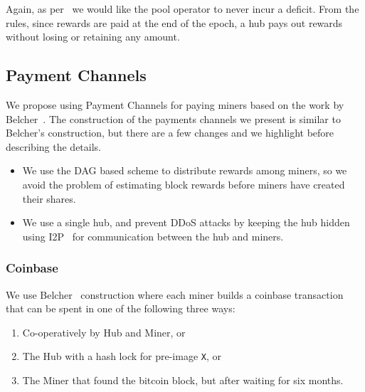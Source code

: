 \documentclass{article}
\begin{document}
Again, as per~\cite{incentives-compatible} we would like the pool
operator to never incur a deficit. From the rules, since rewards are
paid at the end of the epoch, a hub pays out rewards without losing or
retaining any amount.

\subsection{Payment Channels}\label{ref:channels}

We propose using Payment Channels for paying miners based on the work
by Belcher~\cite{channels-for-rewards}. The construction of the
payments channels we present is similar to Belcher's construction, but
there are a few changes and we highlight before describing the
details.

\begin{itemize}
\item We use the DAG based scheme to distribute rewards among miners,
  so we avoid the problem of estimating block rewards before miners
  have created their shares.
\item We use a single hub, and prevent DDoS attacks by keeping the hub
  hidden using I2P~\cite{i2p, i2p-censorship-resistance} for
  communication between the hub and miners.
\end{itemize}



\subsubsection{Coinbase}

We use Belcher~\cite{channels-for-rewards} construction where each
miner builds a coinbase transaction that can be spent in one of the
following three ways:

\begin{enumerate}
\item Co-operatively by Hub and Miner, or
\item The Hub with a hash lock for pre-image \verb|X|, or
\item The Miner that found the bitcoin block, but after waiting
  for six months.
\end{enumerate}
\end{document}
